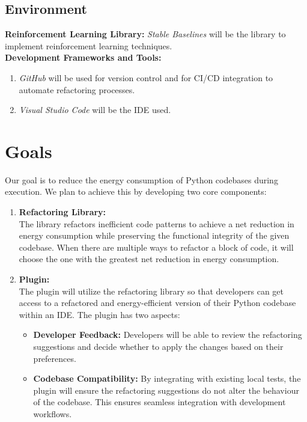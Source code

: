 \documentclass{article}
\begin{document}
\subsection{Environment}
\textbf{Reinforcement Learning Library:} \textit{Stable Baselines} will be the library to implement reinforcement learning techniques.\\
\textbf{Development Frameworks and Tools:} 
\begin{enumerate}

    \item \textit{GitHub} will be used for version control and for CI/CD integration to automate refactoring processes.
    \item \textit{Visual Studio Code} will be the IDE used.
    
\end{enumerate} 


\section{Goals}

Our goal is to reduce the energy consumption of Python codebases during execution. We plan to achieve this by developing two core components:

\begin{enumerate}
    \item \textbf{Refactoring Library:} \\
    The library refactors inefficient code patterns to achieve a net reduction in energy consumption while preserving the functional integrity of the given codebase. When there are multiple ways to refactor a block of code, it will choose the one with the greatest net reduction in energy consumption.

    \item \textbf{Plugin:} \\
    The plugin will utilize the refactoring library so that developers can get access to a refactored and energy-efficient version of their Python codebase within an IDE. The plugin has two aspects:

    \begin{itemize}
        \item \textbf{Developer Feedback:} Developers will be able to review the refactoring suggestions and decide whether to apply the changes based on their preferences.
        \item \textbf{Codebase Compatibility:} By integrating with existing local tests, the plugin will ensure the refactoring suggestions do not alter the behaviour of the codebase. This ensures seamless integration with development workflows.
    \end{itemize}
\end{enumerate}
\end{document}
